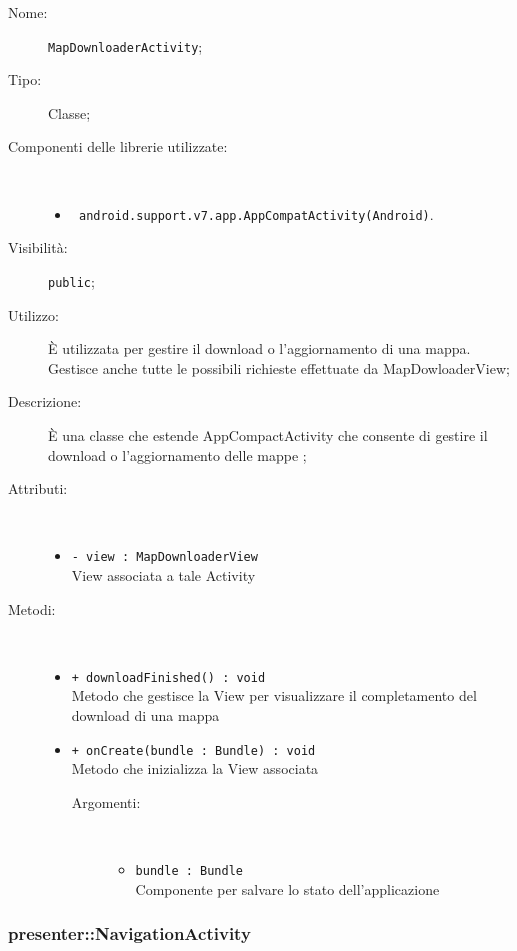 \documentclass[../DefinizioneDiProdotto.tex]{subfiles}
\begin{document}
    \begin{description}
\item[Nome:] \texttt{MapDownloaderActivity};
\item[Tipo:] Classe;
\item[Componenti delle librerie utilizzate:] \
\begin{itemize}
\item \texttt{ android.support.v7.app.AppCompatActivity(Android)}.

\end{itemize}
\item[Visibilità:] \texttt{public};
\item[Utilizzo:] È utilizzata per gestire il download o l'aggiornamento di una mappa. Gestisce anche tutte le possibili richieste effettuate da MapDowloaderView;
\item[Descrizione:] È una classe che estende AppCompactActivity che consente di gestire il download o l'aggiornamento delle mappe
;
\item[Attributi:] \
\begin{itemize}
\item \texttt{- view : MapDownloaderView}\\
View associata a tale Activity

\end{itemize}
\item[Metodi:] \
\begin{itemize}
\item \texttt{+ downloadFinished() : void}\\
Metodo che gestisce la View per visualizzare il completamento del download di una mappa
 \item \texttt{+ onCreate(bundle : Bundle) : void}\\
Metodo che inizializza la View associata
 \begin{description}
\item[Argomenti:] \
\begin{itemize}
\item \texttt{bundle : Bundle}\\
Componente per salvare lo stato dell'applicazione\end{itemize}
\end{description}
\end{itemize}
\end{description}

\subsubsection{presenter::NavigationActivity}
\end{document}

